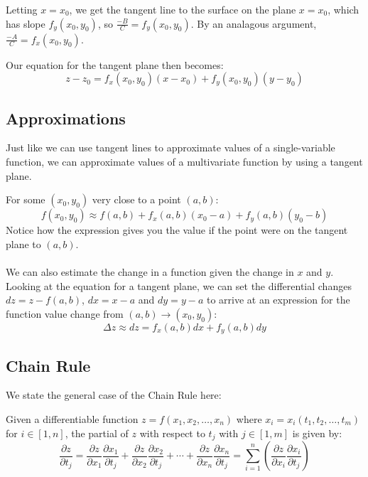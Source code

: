 \documentclass[12pt]{article}
\begin{document}
Letting $x = x_0$, we get the tangent line to the surface on the plane $x = x_0$, which has slope $f_y(x_0,y_0)$, so $\frac{-B}{C} = f_y(x_0,y_0)$. By an analagous argument, $\frac{-A}{C} = f_x(x_0,y_0)$.

Our equation for the tangent plane then becomes:\[ \boxed{z - z_0 = f_x(x_0,y_0)(x-x_0) + f_y(x_0,y_0)(y-y_0)} \]

\subsection{Approximations}
Just like we can use tangent lines to approximate values of a single-variable function, we can approximate values of a multivariate function by using a tangent plane. 

For some $(x_0,y_0)$ very close to a point $(a,b)$:
\[ \boxed{f(x_0,y_0) \approx f(a,b) + f_x(a,b)(x_0 - a) + f_y(a,b)(y_0-b)} \]
Notice how the expression gives you the value if the point were on the tangent plane to $(a,b)$. \\ \\
We can also estimate the change in a function given the change in $x$ and $y$. Looking at the equation for a tangent plane, we can set the differential changes $dz = z - f(a,b)$, $dx = x-a$ and $dy = y-a$ to arrive at an expression for the function value change from $(a,b) \to (x_0,y_0)$:
\[ \boxed{\Delta z \approx dz = f_x(a,b)dx + f_y(a,b)dy} \]

\subsection{Chain Rule}
We state the general case of the Chain Rule here:
\begin{theorem}
Given a differentiable function $z = f(x_1,x_2,\dots,x_n)$ where $x_i = x_i(t_1,t_2,\dots,t_m)$ for $i \in [1,n]$, the partial of $z$ with respect to $t_j$ with $j \in [1,m]$ is given by:
\[ \frac{\partial z}{\partial t_j} = \frac{\partial z}{\partial x_1}\frac{\partial x_1}{\partial t_j} + \frac{\partial z}{\partial x_2}\frac{\partial x_2}{\partial t_j} + \cdots + \frac{\partial z}{\partial x_n}\frac{\partial x_n}{\partial t_j} = \sum_{i = 1}^n\left(\frac{\partial z}{\partial x_i}\frac{\partial x_i}{\partial t_j}\right) \]
\end{theorem}
\end{document}
